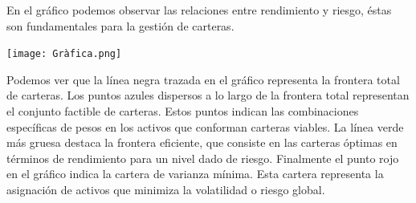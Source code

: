 \documentclass[a4paper,]{article}
\begin{document}
En el gráfico podemos observar las relaciones entre rendimiento y riesgo, éstas son fundamentales para la gestión de carteras. \\


\begin{center}
    \texttt{[image: Gràfica.png]}
\end{center}

Podemos ver que la línea negra trazada en el gráfico representa la frontera total de carteras. Los puntos azules dispersos a lo largo de la frontera total representan el conjunto factible de carteras. Estos puntos indican las combinaciones específicas de pesos en los activos que conforman carteras viables. La línea verde más gruesa destaca la frontera eficiente, que consiste en las carteras óptimas en términos de rendimiento para un nivel dado de riesgo. Finalmente el punto rojo en el gráfico indica la cartera de varianza mínima. Esta cartera representa la asignación de activos que minimiza la volatilidad o riesgo global.
\end{document}
